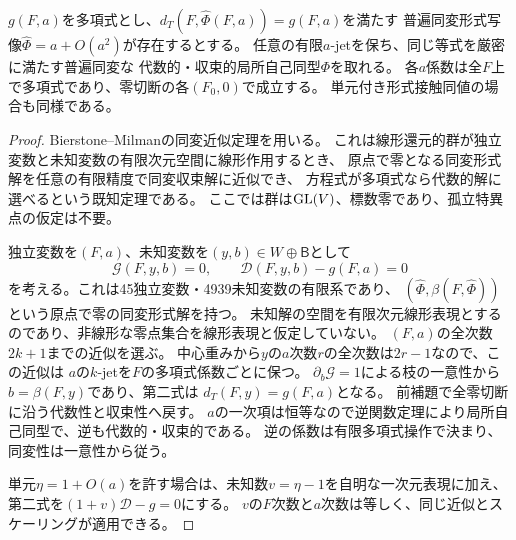 \begin{theorem}[形式右同値の同変代数化]
\label{thm:pf-equivariant-right-algebraization}
$g(F,a)$を多項式とし、$d_T(F,\widehat\Phi(F,a))=g(F,a)$を満たす
普遍同変形式写像$\widehat\Phi=a+O(a^2)$が存在するとする。
任意の有限$a$-jetを保ち、同じ等式を厳密に満たす普遍同変な
代数的・収束的局所自己同型$\Phi$を取れる。
各$a$係数は全$F$上で多項式であり、零切断の各$(F_0,0)$で成立する。
単元付き形式接触同値の場合も同様である。
\end{theorem}
\begin{proof}
Bierstone--Milman\cite[Theorem A]{PfBM}の同変近似定理を用いる。
これは線形還元的群が独立変数と未知変数の有限次元空間に線形作用するとき、
原点で零となる同変形式解を任意の有限精度で同変収束解に近似でき、
方程式が多項式なら代数的解に選べるという既知定理である。
ここでは群は$\mathrm{GL}(V)$、標数零であり、孤立特異点の仮定は不要。

独立変数を$(F,a)$、未知変数を$(y,b)\in W\oplus\mathsf B$として
\[
 \mathcal G(F,y,b)=0,\qquad \mathcal D(F,y,b)-g(F,a)=0
\]
を考える。これは45独立変数・4939未知変数の有限系であり、
$(\widehat\Phi,\beta(F,\widehat\Phi))$という原点で零の同変形式解を持つ。
未知解の空間を有限次元線形表現とするのであり、非線形な零点集合を線形表現と仮定していない。
$(F,a)$の全次数$2k+1$までの近似を選ぶ。
中心重みから$y$の$a$次数$r$の全次数は$2r-1$なので、この近似は
$a$の$k$-jetを$F$の多項式係数ごとに保つ。
$\partial_b\mathcal G=1$による枝の一意性から$b=\beta(F,y)$であり、第二式は
$d_T(F,y)=g(F,a)$となる。
前補題で全零切断に沿う代数性と収束性へ戻す。
$a$の一次項は恒等なので逆関数定理により局所自己同型で、逆も代数的・収束的である。
逆の係数は有限多項式操作で決まり、同変性は一意性から従う。

単元$\eta=1+O(a)$を許す場合は、未知数$v=\eta-1$を自明な一次元表現に加え、
第二式を$(1+v)\mathcal D-g=0$にする。
$v$の$F$次数と$a$次数は等しく、同じ近似とスケーリングが適用できる。
\end{proof}

